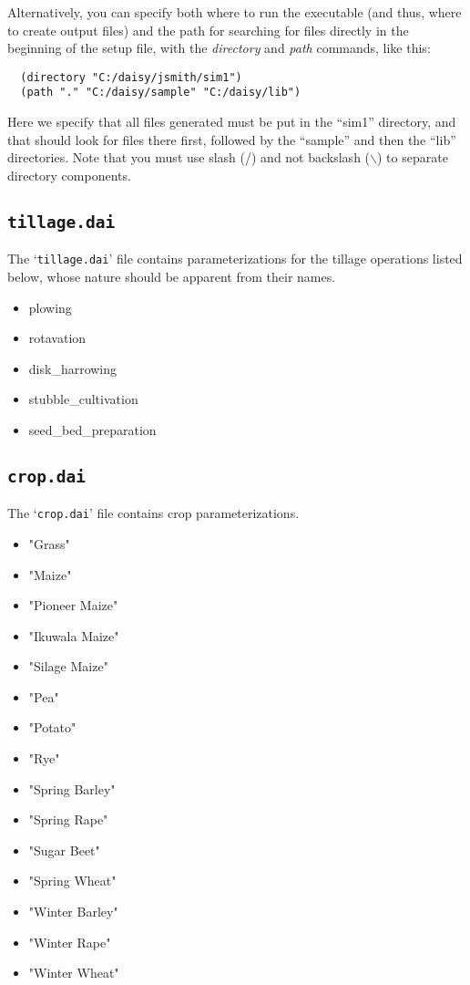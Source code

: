 Alternatively, you can specify both where to run the executable (and
thus, where to create output files) and the path for searching for
files directly in the beginning of the setup file, with the
\emph{directory} and \emph{path} commands, like this:
\begin{verbatim}
  (directory "C:/daisy/jsmith/sim1")
  (path "." "C:/daisy/sample" "C:/daisy/lib")
\end{verbatim}
Here we specify that all files generated must be put in the ``sim1''
directory, and that \daisy{} should look for files there first,
followed by the ``sample'' and then the ``lib'' directories.  Note
that you must use slash (/) and not backslash (\mbox{$\backslash$}) to
separate directory components. 


\subsection{\texttt{tillage.dai}}

The `\texttt{tillage.dai}' file contains parameterizations for the
tillage operations listed below, whose nature should be apparent from
their names.
\begin{itemize}
\item plowing
\item rotavation
\item disk\_harrowing
\item stubble\_cultivation
\item seed\_bed\_preparation
\end{itemize}

\subsection{\texttt{crop.dai}}

The `\texttt{crop.dai}' file contains crop parameterizations.

\begin{itemize}
\item "Grass"
\item "Maize"
\item "Pioneer Maize"
\item "Ikuwala Maize"
\item "Silage Maize"
\item "Pea"
\item "Potato"
\item "Rye"
\item "Spring Barley"
\item "Spring Rape"
\item "Sugar Beet"
\item "Spring Wheat"
\item "Winter Barley"
\item "Winter Rape"
\item "Winter Wheat"
\end{itemize}

